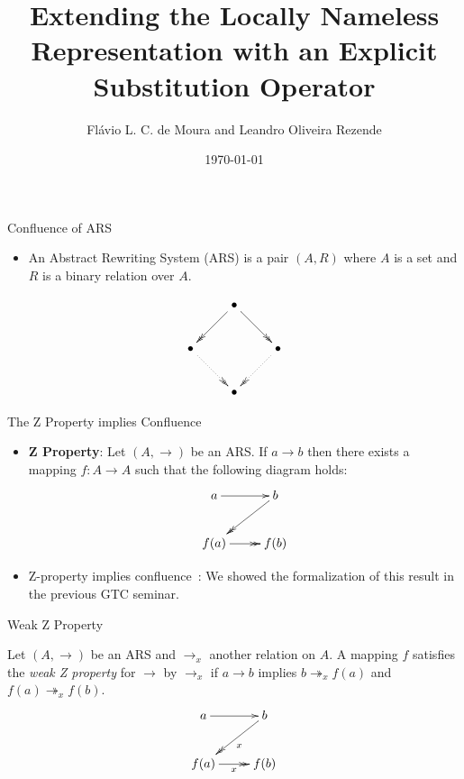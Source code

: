 \documentclass[10pt]{beamer}
\title{Extending the Locally Nameless Representation with an Explicit Substitution Operator}
\date{\today}
\author{Flávio L. C. de Moura and Leandro Oliveira Rezende}
\institute{Seminário GTC/UnB}
\newcommand{\tto}{\twoheadrightarrow}
\begin{document}
\maketitle

\begin{frame}[fragile]{Confluence of ARS}
    \begin{itemize}
    \item An Abstract Rewriting System (ARS) is a pair $(A,R)$ where
      $A$ is a set and $R$ is a binary relation over $A$.
  \end{itemize}
    \[
      \xymatrix{
        & \bullet \ar@{->>}[dl] \ar@{->>}[dr] & \\
        \bullet \ar@{.>>}[dr] &  & \bullet \ar@{.>>}[dl] \\
        & \bullet & }
    \]
\end{frame}

\begin{frame}[fragile]{The Z Property implies Confluence}
  \begin{itemize}
  \item  {\bf Z Property}: Let $(A,\to)$ be an ARS. If $a\to b$ then there exists a mapping $f:A \to A$ such that the following diagram holds:
    \[
      \xymatrix{
        a \ar[r] &  b \ar@{->>}[dl]\\
        f(a) \ar@{->>}[r] & f(b) \\ 
      }
    \]
    \item Z-property implies confluence~\cite{ZPropertyDraft}: We showed the formalization of this result in the previous GTC seminar.
  \end{itemize}
\end{frame}

\begin{frame}[fragile]{Weak Z Property}
  \begin{definition}
  Let $(A,\to)$ be an ARS and $\to_x$ another relation on $A$. A
  mapping $f$ satisfies the {\it weak Z property} for $\to$ by $\to_x$
  if $a\to b$ implies $b \tto_x f(a)$ and $f(a) \tto_x
  f(b)$. %
    \[
      \xymatrix{
        a \ar[r] &  b \ar@{->>}[dl]^x\\
        f(a) \ar@{->>}[r]_x & f(b) \\ 
      }
    \]

\end{definition}
\end{frame}
\end{document}
